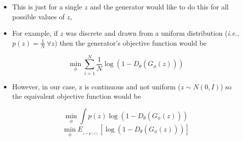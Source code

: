 \begin{frame}
	\begin{columns}
		\begin{overlayarea}{\textwidth}{\textheight}
			\vspace*{10mm}
			\begin{center}
						
			\end{center}		
		\end{overlayarea}

		\begin{overlayarea}{\textwidth}{\textheight}
			\begin{itemize}[<+->]
				\item This is just for a single $z$ and the generator would like to do this for all possible values of $z$,
				\item For example, if $z$ was discrete and drawn from a uniform distribution (\textit{i.e.}, $p(z) = \frac{1}{N} ~ \forall z$) then the generator's objective function would be 

				$$ \min\limits_{\phi}  \sum_{i=1}^{N} \frac{1}{N} \log (1 - D_{\theta}(G_{\phi}(z))) $$

				\item However, in our case, z is continuous and not uniform ($z \sim N(0, I)$) so the equivalent objective function would be 

				$$\min \limits_{\phi} \int p(z) \log(1 - D_{\theta}(G_{\phi}(z)))$$
				$$\min \limits_{\phi}  E_{_{z \sim p(z)}} [\log (1 - D_{\theta}(G_{\phi}(z)))] $$

			\end{itemize}
		\end{overlayarea}
	\end{columns}
\end{frame}

